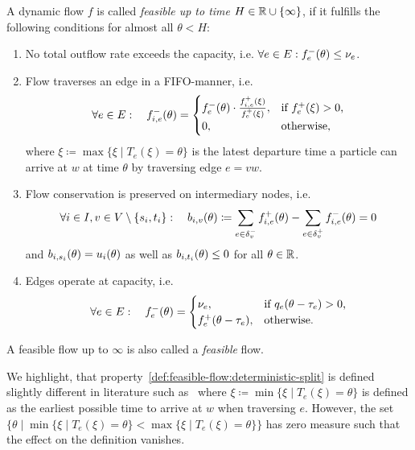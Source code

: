 \begin{definition}\label{def:feasible-flow}
    A dynamic flow $f$ is called \emph{feasible up to time $H\in\mathbb{R} \cup \{\infty \}$}, if it fulfills the following conditions for almost all $\theta < H$:
    \begin{enumerate}[label=(F\arabic*)]
        \item\label{def:feasible-flow:max-capacity} No total outflow rate exceeds the capacity, i.e. $\forall e\in E: {f}^-_e(\theta)\leq \nu_e$.
        \item\label{def:feasible-flow:deterministic-split} Flow traverses an edge in a FIFO-manner, i.e. \[
            \forall e\in E: \quad 
            {f}^-_{i,e}(\theta) = \begin{cases}
                {f}^-_e(\theta) \cdot \frac{{f}^+_{i,e}(\xi)}{{f}^+_e(\xi)}, & \text{if ${f}^+_e(\xi) > 0$,}\\
                0, & \text{otherwise,}
        \end{cases}
        \]
        where $\xi\coloneqq \max \{ \xi  \mid T_e(\xi) = \theta \}$ is the latest departure time a particle can arrive at $w$ at time $\theta$ by traversing edge $e=vw$. 
        \item\label{def:feasible-flow:flow-conservation} Flow conservation is preserved on intermediary nodes, i.e. \[\forall i\in I, v\in V\setminus\{ s_i, t_i \}: \quad
        b_{i,v}(\theta)\coloneqq \sum_{e\in\delta^-_{v}}{f}^+_{i,e}(\theta) - \sum_{e\in\delta^+_{v}} {f}^-_{i,e}(\theta) = 0 \]
        and $b_{i,s_i}(\theta) = u_i(\theta)$ as well as $b_{i,t_i}(\theta) \leq 0$ for all $\theta\in\mathbb{R}$.

        \item\label{def:feasible-flow:operate-at-capacity} Edges operate at capacity, i.e. 
        \[
            \forall e\in E: \quad {f}^-_{e}(\theta) = \begin{cases}
                \nu_e, &\text{if $q_e(\theta - \tau_e)>0$,} \\
                {f}^+_e(\theta-\tau_e), &\text{otherwise.}
            \end{cases}
        \]
    \end{enumerate}
    A feasible flow up to $\infty$ is also called a \emph{feasible} flow.
\end{definition}



\begin{remark}
    We highlight, that property~\ref{def:feasible-flow:deterministic-split} is defined slightly different in literature such as~\cite{Graf2020} where $\xi\coloneqq \min \{ \xi  \mid T_e(\xi) = \theta \}$ is defined as the earliest possible time to arrive at $w$ when traversing $e$.
    However, the set $\{\theta \mid \min \{ \xi  \mid T_e(\xi) = \theta \} < \max \{ \xi  \mid T_e(\xi) = \theta \} \}$ has zero measure such that the effect on the definition vanishes.
\end{remark}

